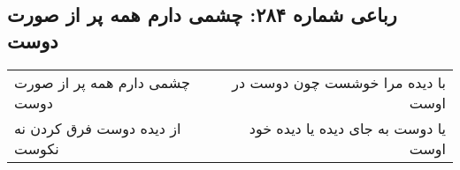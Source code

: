 \begin{center}
\section*{رباعی شماره ۲۸۴: چشمی دارم همه پر از صورت دوست}
\label{sec:0284}
\begin{longtable}{l p{0.5cm} r}
چشمی دارم همه پر از صورت دوست
&&
با دیده مرا خوشست چون دوست در اوست
\\
از دیده دوست فرق کردن نه نکوست
&&
یا دوست به جای دیده یا دیده خود اوست
\\
\end{longtable}
\end{center}

